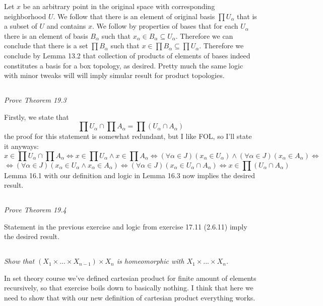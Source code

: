\documentclass[11pt,oneside,titlepage]{book}
\DeclareMathOperator \lra {\Leftrightarrow}
\begin{document}
Let $x$ be an arbitrary point in the original space with corresponding
neighborhood $U$. We follow that there is an element of original basis $\prod U_\alpha$
that is a subset of $U$ and contains $x$. We follow by properties of bases
that for each $U_\alpha$ there is an element of basis $B_\alpha$ such that
$x_\alpha \in B_\alpha \subseteq U_\alpha$. Therefore we can conclude that there is
a set $\prod B_\alpha$ such that $x \in \prod B_\alpha \subseteq \prod U_\alpha$. Therefore
we conclude by Lemma 13.2 that collection of products of elements of bases indeed
constitutes a basis for a box topology, as desired. Pretty much the same logic
with minor tweaks will will imply simular result for product topologies.

\subsection{}

\textit{Prove Theorem 19.3}

Firstly, we state that
$$\prod U_\alpha \cap \prod A_\alpha = \prod{(U_\alpha \cap A_\alpha)}$$
the proof for this statement is somewhat redundant, but I like FOL, so I'll state it
anyways:
$$x \in \prod U_\alpha \cap \prod A_\alpha \lra
x \in \prod U_\alpha \land x \in \prod A_\alpha \lra 
(\forall \alpha \in J)(x_\alpha \in U_\alpha) \land (\forall \alpha \in J)(x_\alpha \in A_\alpha) \lra $$
$$ \lra 
(\forall \alpha \in J)(x_\alpha \in U_\alpha \land x_\alpha \in A_\alpha) \lra
(\forall \alpha \in J)(x_\alpha \in U_\alpha \cap A_\alpha) \lra 
x \in \prod{(U_\alpha \cap A_\alpha)}$$
Lemma 16.1 with our definition and logic in Lemma 16.3 now implies the desired result.

\subsection{}

\textit{Prove Theorem 19.4}

Statement in the previous exercise and logic from exercise 17.11 (2.6.11) imply the desired
result.

\subsection{}

\textit{Show that $(X_1 \times ... \times X_{n - 1}) \times X_n$ is homeomorphic with
  $X_1 \times ... \times X_n$.}

In set theory course we've defined cartesian product for finite amount of elements
recursively, so that exercise boils down to basically nothing. I think that here
we need to show that with our new definition of cartesian product everything works.
\end{document}
